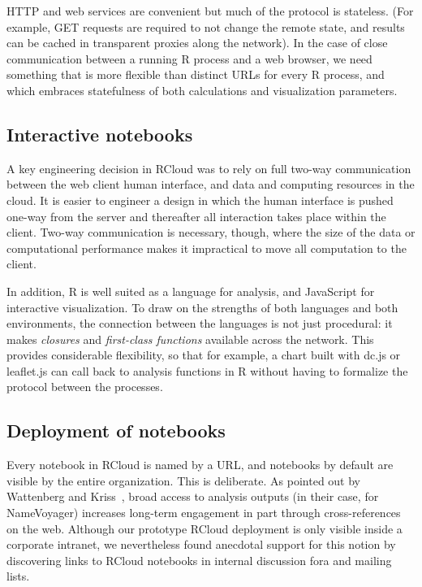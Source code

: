 HTTP and web services are convenient but much of the protocol is
stateless. (For example, GET requests are required to not change the
remote state, and results can be cached in transparent proxies along
the network). In the case of close communication between a running
R process and a web browser, we need something that is more flexible
than distinct URLs for every R process, and which embraces
statefulness of both calculations and visualization parameters.

\subsection{Interactive notebooks\label{sec:interactivenotebooks}}




A key engineering decision in RCloud was to rely on full two-way
communication between the web client human interface, and data and
computing resources in the cloud. It is easier to engineer a design
in which the human interface is pushed one-way from the server
and thereafter all interaction takes place within the client.
Two-way communication is necessary, though, where the size of
the data or computational performance makes it impractical to
move all computation to the client.

In addition, R is well suited as a language for analysis, and
JavaScript for interactive visualization. To draw on
the strengths of both languages and both environments, the connection
between the languages is not just procedural: it makes \emph{closures}
and \emph{first-class functions} available across the network.
This provides considerable flexibility, so that for example, a chart built
with dc.js or leaflet.js can call back to analysis functions in R
without having to formalize the protocol between the processes.

\subsection{Deployment of notebooks\label{sec:deployment}}

Every notebook in RCloud is named by a URL, and notebooks by
default are visible by the entire organization. This is deliberate.
As pointed out by Wattenberg and Kriss~\cite{Wattenberg:2011:DFS},
broad access to analysis outputs (in their case, for NameVoyager)
increases long-term engagement in part through cross-references on
the web. Although our prototype RCloud deployment is only visible
inside a corporate intranet, we nevertheless found anecdotal support
for this notion by discovering links to RCloud notebooks in internal
discussion fora and mailing lists.

